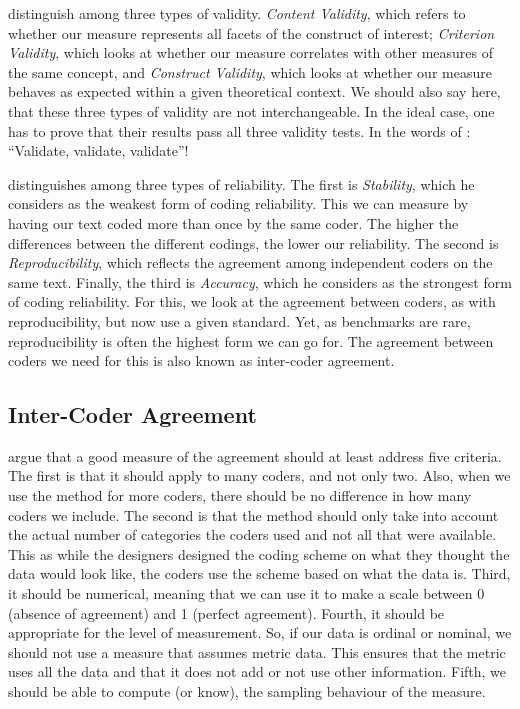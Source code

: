\documentclass[
]{article}
\begin{document}
\textcite{Carmines1979a} distinguish among three types of validity. \emph{Content Validity}, which refers to whether our measure represents all facets of the construct of interest; \emph{Criterion Validity}, which looks at whether our measure correlates with other measures of the same concept, and \emph{Construct Validity}, which looks at whether our measure behaves as expected within a given theoretical context.
We should also say here, that these three types of validity are not interchangeable. In the ideal case, one has to prove that their results pass all three validity tests. In the words of \textcite{Grimmer2013a}: ``Validate, validate, validate''!

\textcite{Krippendorff2004a} distinguishes among three types of reliability. The first is \emph{Stability}, which he considers as the weakest form of coding reliability. This we can measure by having our text coded more than once by the same coder. The higher the differences between the different codings, the lower our reliability. The second is \emph{Reproducibility}, which reflects the agreement among independent coders on the same text. Finally, the third is \emph{Accuracy}, which he considers as the strongest form of coding reliability. For this, we look at the agreement between coders, as with reproducibility, but now use a given standard. Yet, as benchmarks are rare, reproducibility is often the highest form we can go for. The agreement between coders we need for this is also known as inter-coder agreement.

\hypertarget{inter-coder-agreement}{%
\subsection{Inter-Coder Agreement}\label{inter-coder-agreement}}

\textcite[p.79]{Hayes2007a} argue that a good measure of the agreement should at least address five criteria. The first is that it should apply to many coders, and not only two. Also, when we use the method for more coders, there should be no difference in how many coders we include. The second is that the method should only take into account the actual number of categories the coders used and not all that were available. This as while the designers designed the coding scheme on what they thought the data would look like, the coders use the scheme based on what the data is. Third, it should be numerical, meaning that we can use it to make a scale between 0 (absence of agreement) and 1 (perfect agreement). Fourth, it should be appropriate for the level of measurement. So, if our data is ordinal or nominal, we should not use a measure that assumes metric data. This ensures that the metric uses all the data and that it does not add or not use other information. Fifth, we should be able to compute (or know), the sampling behaviour of the measure.
\end{document}
